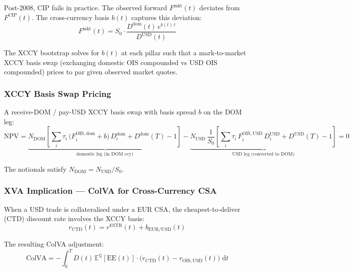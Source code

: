 \documentclass[11pt, a4paper]{article}
\begin{document}
Post-2008, CIP fails in practice. The observed forward $F^{\mathrm{mkt}}(t)$
deviates from $F^{\mathrm{CIP}}(t)$. The cross-currency basis $b(t)$ captures
this deviation:
\begin{equation}
  F^{\mathrm{mkt}}(t)
  = S_0 \cdot \frac{D^{\mathrm{dom}}(t)\,e^{b(t)\,t}}{D^{\mathrm{USD}}(t)}
\end{equation}

The XCCY bootstrap solves for $b(t)$ at each pillar such that a mark-to-market
XCCY basis swap (exchanging domestic OIS compounded vs USD OIS compounded) prices
to par given observed market quotes.

\subsubsection{XCCY Basis Swap Pricing}

A receive-DOM / pay-USD XCCY basis swap with basis spread $b$ on the DOM leg:
\begin{equation}
  \mathrm{NPV}
  = \underbrace{N_{\mathrm{DOM}}\left[
      \sum_i \tau_i\,\bigl(F^{\mathrm{OIS,dom}}_i + b\bigr)\,D^{\mathrm{dom}}_i
      + D^{\mathrm{dom}}(T) - 1
    \right]}_{\text{domestic leg (in DOM ccy)}}
  - \underbrace{N_{\mathrm{USD}}\,\frac{1}{S_0}\left[
      \sum_i \tau_i\,F^{\mathrm{OIS,USD}}_i\,D^{\mathrm{USD}}_i
      + D^{\mathrm{USD}}(T) - 1
    \right]}_{\text{USD leg (converted to DOM)}}
  = 0
\end{equation}

The notionals satisfy $N_{\mathrm{DOM}} = N_{\mathrm{USD}}/S_0$.

\subsubsection{XVA Implication — ColVA for Cross-Currency CSA}

When a USD trade is collateralised under a EUR CSA, the cheapest-to-deliver
(CTD) discount rate involves the XCCY basis:
\begin{equation}
  r_{\mathrm{CTD}}(t) = r^{\mathrm{\text{€STR}}}(t) + b_{\mathrm{EUR/USD}}(t)
\end{equation}

The resulting ColVA adjustment:
\begin{equation}
  \mathrm{ColVA} = -\int_0^T D(t)\,\mathbb{E}^{\mathbb{Q}}\!\left[\mathrm{EE}(t)\right]
                   \cdot \bigl(r_{\mathrm{CTD}}(t) - r_{\mathrm{OIS,USD}}(t)\bigr)\,\,\mathrm{d}t
\end{equation}
\end{document}
